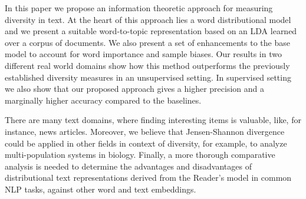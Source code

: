 In this paper we propose an information theoretic approach for measuring diversity in text. At the heart of this approach lies a word distributional model and we present a suitable word-to-topic representation based on an LDA learned over a corpus of documents. We also present a set of enhancements to the base model to account for word importance and sample biases. Our results in two different real world domains show how this method outperforms the previously established  diversity measures in an unsupervised setting. In supervised setting we also show that our proposed approach gives a higher precision and a marginally higher accuracy compared to the baselines.

There are many text domains, where finding interesting items is valuable, 
like, for instance, news articles. Moreover, we believe that Jensen-Shannon 
divergence could be applied in other fields in context of diversity, for example, 
to analyze multi-population systems in biology. Finally, a more thorough comparative analysis 
is needed to determine the advantages and disadvantages of distributional text 
representations derived from the Reader's model in common NLP tasks, 
against other word and text embeddings.

 